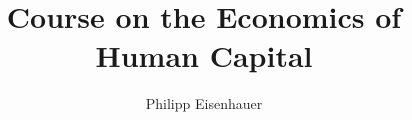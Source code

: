 

\title{Course on the Economics of Human Capital}
\author{Philipp Eisenhauer}

\date{}

\let\otp\titlepage
